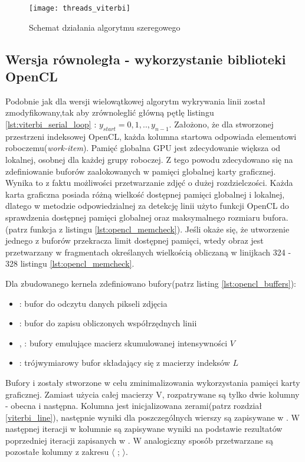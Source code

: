 \documentclass[document.tex]{subfiles}
\begin{document}
\begin{figure}[h]
\texttt{[image: threads\_viterbi]}
\caption{Schemat działania algorytmu szeregowego}
\label{fig:threads_viterbi}
\end{figure}

\clearpage
\subsection{Wersja równoległa - wykorzystanie biblioteki OpenCL}
\indent Podobnie jak dla wersji wielowątkowej algorytm wykrywania linii został zmodyfikowany,tak aby 
zrównoleglić główną pętlę listingu \ref{lst:viterbi_serial_loop} : $y_{start} = 0,1,.., y_{n-1}$.
Założono, że dla stworzonej przestrzeni indeksowej OpenCL, każda kolumna startowa odpowiada elementowi roboczemu(\textit{work-item}). 
\indent Pamięć globalna GPU jest zdecydowanie większa od lokalnej, osobnej dla każdej grupy roboczej.
Z tego powodu zdecydowano się na zdefiniowanie buforów zaalokowanych w pamięci globalnej karty graficznej.
Wynika to z faktu możliwości przetwarzanie zdjęć o dużej rozdzielczości. Każda karta graficzna posiada różną wielkość dostępnej pamięci globalnej i lokalnej, dlatego w metodzie  odpowiedzialnej za detekcję linii użyto funkcji OpenCL do sprawdzenia dostępnej pamięci globalnej oraz maksymalnego rozmiaru bufora.(patrz funkcja  z listingu \ref{lst:opencl_memcheck}). Jeśli okaże się, że
utworzenie jednego z buforów przekracza limit dostępnej pamięci, wtedy obraz jest przetwarzany w fragmentach
określanych wielkością  obliczaną w linijkach 324 - 328 listingu \ref{lst:opencl_memcheck}.

 

\indent Dla zbudowanego kernela zdefiniowano bufory(patrz listing \ref{lst:opencl_buffers}):
\begin{itemize}
\item {} : bufor do odczytu danych pikseli zdjęcia
\item {} : bufor do zapisu obliczonych współrzędnych linii
\item {},  : bufory emulujące macierz skumulowanej intensywności $V$
\item {} : trójwymiarowy bufor składający się z  macierzy indeksów $L$
\end{itemize}
Bufory  i  zostały stworzone w celu zminimalizowania wykorzystania pamięci karty graficznej.
Zamiast użycia całej macierzy V, rozpatrywane są tylko dwie kolumny - obecna i następna. Kolumna
 jest inicjalizowana zerami(patrz rozdział \ref{viterbi_line}), następnie wyniki dla poszczególnych 
wierszy są zapisywane w . W następnej iteracji w kolumnie  są zapisywane wyniki na podstawie rezultatów poprzedniej iteracji zapisanych w . W analogiczny sposób przetwarzane są pozostałe kolumny z zakresu $\langle$ ; $\rangle$.
\end{document}
